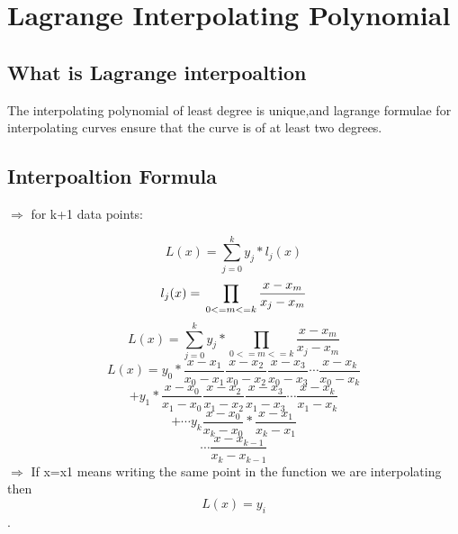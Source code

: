 \documentclass[a4paper, 12pt]{article}
\begin{document}
\section{\textbf{Lagrange Interpolating Polynomial}}
\subsection{What is Lagrange interpoaltion}
The interpolating polynomial of least degree is unique,and lagrange formulae for interpolating curves ensure that the curve is of at least two degrees.
\subsection{Interpoaltion Formula}
$\Longrightarrow$ for k+1 data points:

\[L(x)=\sum\limits^k_{j=0}{y_j}*{l_j}(x)\] \[{l_j}(x)=\\\prod_{0<=m<=k}\dfrac{x-x_m}{x_j-x_m}\]
\[L(x)= \sum\limits^k_{j=0}{y_j}*\prod_{0<=m<=k}\dfrac{x-x_m}{x_j-x_m}\]
\[L(x)= y_0*\dfrac{x-x_1}{x_0-x_1}\dfrac{x-x_2}{x_0-x_2}\dfrac{x-x_3}{x_0-x_3}\dotsb\dfrac{x-x_k}{x_0-x_k}\]\[+y_1*\dfrac{x-x_0}{x_1-x_0}\dfrac{x-x_2}{x_1-x_2}\dfrac{x-x_3}{x_1-x_3}\dotsb\dfrac{x-x_k}{x_1-x_k}\]
\[+\dotsb y_k\dfrac{x-x_0}{x_k-x_0}*\dfrac{x-x_1}{x_k-x_1}\]\[\dotsb\dfrac{x-x_{k-1}}{x_k-x_{k-1}}\]
$\Longrightarrow$ If x=x1 means writing the same point in the function we are interpolating then \[L(x)=y_i\].
\end{document}
